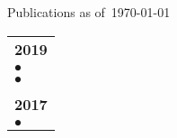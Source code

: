 \documentclass{article}
\def\Title{Publications en date du}
\def\Title{Publications as of}
\newcommand{\docite}[1]{$\bullet$ \fullcite{#1}}
\begin{document}
\begingroup
 \centering 
 \vspace*{\baselineskip} 
 {\LARGE \Title\ \today}
 \vspace*{1\baselineskip}
\endgroup

\renewcommand{\arraystretch}{1.2}
\setlength{\tabcolsep}{0pt}
\begin{tabular}{m{}}
 \\\textbf{2019} \\
 \docite{GodinDubois2019b} \\
 \docite{GodinDubois2019a} \\

 \\\textbf{2017} \\
 \docite{Dubois2017}
\end{tabular}
\end{document}
